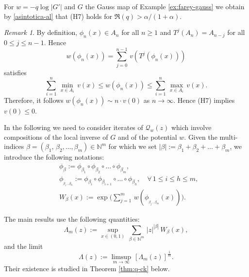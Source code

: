 \documentclass[11pt]{amsart}
\theoremstyle{definition}
\theoremstyle{remark}
\newtheorem{rem}[theorem]{Remark}
\theoremstyle{definition}
\numberwithin{equation}{section}
\newcommand{\N}{\mathbb N}
\newcommand{\QQ}{\mathcal{Q}}
\begin{document}
For $w= -q \log |G'|$ and $G$ the Gauss map of Example \ref{ex:farey-gauss} we obtain by \eqref{asintotica-al} that (H7) holds for $\Re(q)> \alpha/(1+\alpha)$.
 
\begin{rem} \label{rem:v0}
By definition, $\phi_n(x) \in A_n$ for all $n\ge 1$ and $T^j(A_n)=A_{n-j}$ for all $0\le j\le n-1$. Hence
\[
w(\phi_n(x)) = \sum_{j=0}^{n-1}\, v(T^j(\phi_n(x)))
\]
satisfies
\[
\sum_{i=1}^{n}\, \min_{x\in A_i}\, v(x) \le w(\phi_n(x)) \le \sum_{i=1}^{n}\, \max_{x\in A_i}\, v(x).
\]
Therefore, it follows $w(\phi_n(x)) \sim n\cdot v(0)$ as $n\to \infty$. Hence (H7) implies $v(0)\le 0$.
\end{rem} 

In the following we need to consider iterates of $\QQ_w(z)$ which involve compositions of the local inverse of $G$ and of the potential $w$. Given the multi-indices $\beta = (\beta_1,\, \beta_2,\dots,\beta_m) \in \N^m$ for which we set $|\beta| := \beta_1+\beta_2+\dots+\beta_m$, we introduce the following notations:
\begin{equation}\label{notations}
\begin{aligned}
&\phi_\beta := \phi_{\beta_1} \circ \phi_{\beta_2} \circ \dots \circ \phi_{\beta_m},\\
&\phi_{_{\beta_i\dots\beta_h}} := \phi_{\beta_i} \circ \phi_{\beta_{i+1}} \circ \dots \circ \phi_{\beta_h}, \quad \forall\, 1\le i \le h\le m,\\
&W_\beta(x):= \exp \Big( \sum_{j=1}^m\, w(\phi_{_{\beta_j\dots\beta_m}}(x)) \Big).
\end{aligned}
\end{equation}

The main results use the following quantities:
\begin{equation}\label{lambda-m}
\Lambda_m(z) := \sup_{x\in (0,1)}\, \sum_{\beta \in \N^m}\, |z|^{|\beta|}\, W_\beta(x),
\end{equation}
and the limit
\begin{equation}\label{lambda-z}
\Lambda(z):= \limsup_{m\to \infty}\, [\Lambda_m(z)]^{\frac 1m}.
\end{equation}
Their existence is studied in Theorem \ref{thm:q-ck} below. \\
 
\end{document}
